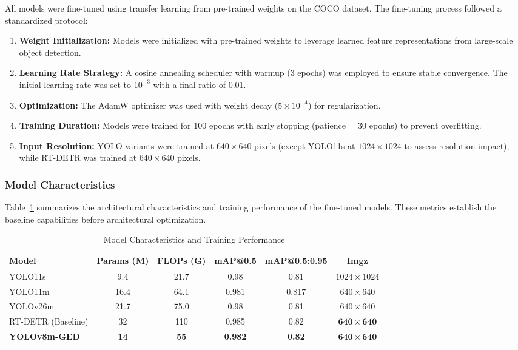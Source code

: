 All models were fine-tuned using transfer learning from pre-trained weights on the COCO dataset. The fine-tuning process followed a standardized protocol:

\begin{enumerate}
    \item \textbf{Weight Initialization:} Models were initialized with pre-trained weights to leverage learned feature representations from large-scale object detection.
    
    \item \textbf{Learning Rate Strategy:} A cosine annealing scheduler with warmup (3 epochs) was employed to ensure stable convergence. The initial learning rate was set to $10^{-3}$ with a final ratio of 0.01.
    
    \item \textbf{Optimization:} The AdamW optimizer was used with weight decay ($5 \times 10^{-4}$) for regularization.
    
    \item \textbf{Training Duration:} Models were trained for 100 epochs with early stopping (patience = 30 epochs) to prevent overfitting.
    
    \item \textbf{Input Resolution:} YOLO variants were trained at $640 \times 640$ pixels (except YOLO11s at $1024 \times 1024$ to assess resolution impact), while RT-DETR was trained at $640 \times 640$ pixels.
\end{enumerate}

\subsubsection{Model Characteristics}

Table~\ref{tab:model_characteristics} summarizes the architectural characteristics and training performance of the fine-tuned models. These metrics establish the baseline capabilities before architectural optimization.

\begin{table}[htbp]
\centering
\caption{Model Characteristics and Training Performance}
\label{tab:model_characteristics}
\begin{tabular}{@{}lccccc@{}}
\toprule
\textbf{Model} & \textbf{Params (M)} & \textbf{FLOPs (G)} & \textbf{mAP@0.5} & \textbf{mAP@0.5:0.95} & \textbf{Imgz} \\ \midrule
YOLO11s        & 9.4  & 21.7  & 0.98 & 0.81 & $1024 \times 1024$ \\
YOLO11m        & 16.4 & 64.1  & 0.981 & 0.817 & $640 \times 640$ \\
YOLOv26m       & 21.7 & 75.0  & 0.98 & 0.81 & $640 \times 640$ \\
RT-DETR (Baseline) & 32 & 110 & 0.985 & 0.82 & $\mathbf{640 \times 640}$ \\ \midrule
\textbf{YOLOv8m-GED} & \textbf{14} & \textbf{55} & \textbf{0.982} & \textbf{0.82} & $\mathbf{640 \times 640}$ \\ \bottomrule
\end{tabular}
\end{table}

